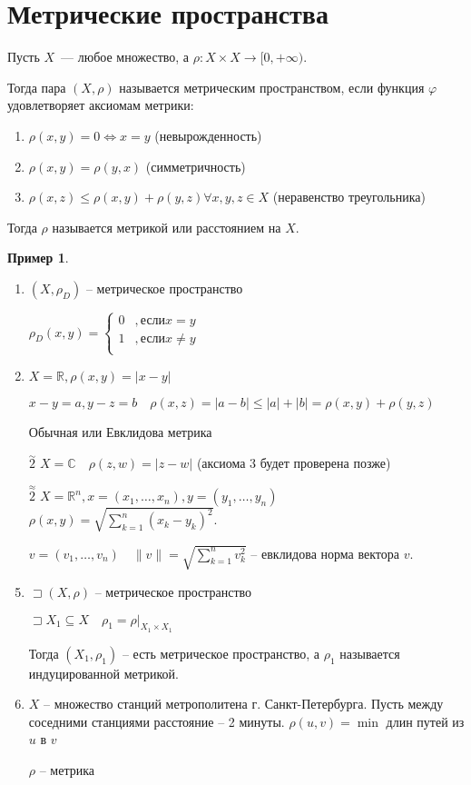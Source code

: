 \documentclass{book}
\newcommand\R{\ensuremath{\mathbb{R}}}
\renewcommand\C{\ensuremath{\mathbb{C}}}
\renewcommand\phi{\varphi}
\theoremstyle{definition}
\newtheorem*{example}{Пример}
\begin{document}
    \section{Метрические пространства}
    \begin{definition}
        Пусть $X$~--- любое множество, а $\rho: X\times X \to [0,+\infty )$.

        Тогда пара $(X, \rho)$ называется метрическим пространством, если функция $\phi$ удовлетворяет аксиомам метрики:
        \begin{enumerate}
            \item $\rho(x,y) = 0 \iff x = y$ (невырожденность)
            \item $\rho(x,y) = \rho(y,x)$ (симметричность)
            \item $\rho(x,z) \leqslant \rho(x,y) + \rho(y,z) \forall x, y, z\in X$ (неравенство треугольника)
        \end{enumerate}

        Тогда $\rho$ называется метрикой или расстоянием на $X$.
    \end{definition}
    \begin{example}
        \begin{enumerate}
            \item $(X, \rho_{D})$ -- метрическое пространство

            $\rho_D(x,y) = \begin{cases}
                0&, \text{если} x=y\\
                1&, \text{если} x\neq y\\
            \end{cases}$
            \item $X=\R, \rho(x,y) = |x-y|$

            $x-y = a, y-z = b\quad \rho(x,z) = |a-b|\leqslant |a| + |b| = \rho(x,y) + \rho(y,z)$

            Обычная или Евклидова метрика
            \item [$\overset{\sim }2$] $X = \C\quad \rho(z,w) = |z-w|$ (аксиома 3 будет проверена позже)
            \item [$\overset{\approx }{2}$]  $X = \R^n, x = (x_1, \ldots, x_{n} ), y = (y_1, \ldots, y_{n} )$ $\rho(x,y) = \sqrt{\sum_{k=1}^{n} \left( x_k-y_k \right) ^2}$.

            $v = (v_1, \ldots, v_n)\quad \|v\| = \sqrt{\sum_{k=1}^{n} v_k^2} $ -- евклидова норма вектора $v$.
            \item $\sqsupset (X, \rho)$ -- метрическое пространство

            $\sqsupset X_1\subseteq X\quad \rho_1 = \rho|_{X_1\times X_1}$

            Тогда $(X_1, \rho_1)$ -- есть метрическое пространство, а $\rho_1$ называется индуцированной метрикой.
            \item $X$ -- множество станций метрополитена г. Санкт-Петербурга.
            Пусть между соседними станциями расстояние -- 2 минуты. $\rho(u,v) = \min$ длин путей из $u$ в $v$

            $\rho$ -- метрика
        \end{enumerate}
    \end{example}
\end{document}
